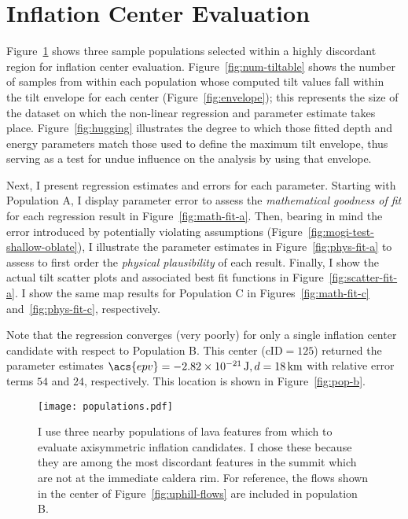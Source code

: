\newpage
\section{Inflation Center Evaluation}

Figure~\ref{fig:populations} shows three sample populations selected within a highly discordant region for inflation center evaluation. Figure~\ref{fig:num-tiltable} shows the number of samples from within each population whose computed tilt values fall within the tilt envelope for each center (Figure~\ref{fig:envelope}); this represents the size of the dataset on which the non-linear regression and parameter estimate takes place. Figure~\ref{fig:hugging} illustrates the degree to which those fitted depth and energy parameters match those used to define the maximum tilt envelope, thus serving as a test for undue influence on the analysis by using that envelope.

Next, I present regression estimates and errors for each parameter. Starting with Population A, I display parameter error to assess the \emph{mathematical goodness of fit} for each regression result in Figure~\ref{fig:math-fit-a}. Then, bearing in mind the error introduced by potentially violating \textcite{mogi_relations_1958} assumptions (Figure~\ref{fig:mogi-test-shallow-oblate}), I illustrate the parameter estimates in Figure~\ref{fig:phys-fit-a} to assess to first order the \emph{physical plausibility} of each result. Finally, I show the actual tilt scatter plots and associated best fit functions in Figure~\ref{fig:scatter-fit-a}. I show the same map results for Population C in Figures~\ref{fig:math-fit-c} and~\ref{fig:phys-fit-c}, respectively.

Note that the regression converges (very poorly) for only a single inflation center candidate with respect to Population B. This center ($\text{cID} = 125$) returned the parameter estimates $\acs{epv}=\qty{-2.82e-21}{\J}, d=\qty{18}{\km}$ with relative error terms $54$ and $24$, respectively. This location is shown in Figure~\ref{fig:pop-b}.

\begin{figure}
    \texttt{[image: populations.pdf]}%
    \caption[Sample populations for inflation center evaluation]{I use three nearby populations of lava features from which to evaluate axisymmetric inflation candidates. I chose these because they are among the most discordant features in the summit which are not at the immediate caldera rim. For reference, the flows shown in the center of Figure~\ref{fig:uphill-flows} are included in population B.}%
    \label{fig:populations}
\end{figure}

